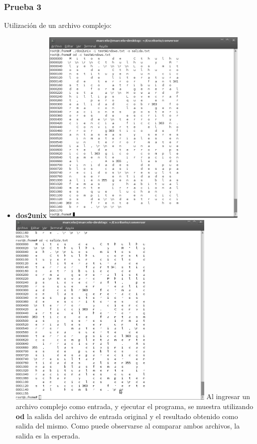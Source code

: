 \documentclass[a4paper,10pt]{article}
\begin{document}
    \subsubsection{Prueba 3}
    Utilizaci\'on de un archivo complejo:
      \begin{itemize}
      \item \textbf{dos2unix}
      \newline
      \includegraphics[width=10cm, viewport=0 0 844 808]{../Informe/Imagenes/prueba3-archivo-dos2unix1.png}
      \newline
      \includegraphics[width=10cm, viewport=0 0 839 798]{../Informe/Imagenes/prueba3-archivo-dos2unix2.png}
      \newline
      Al ingresar un archivo complejo como entrada, y ejecutar el programa, se muestra utilizando {\bf od} la salida
      del archivo de entrada original y el resultado obtenido como salida del mismo. Como puede observarse al comparar
      ambos archivos, la salida es la esperada.
      

\end{itemize}
\end{document}

